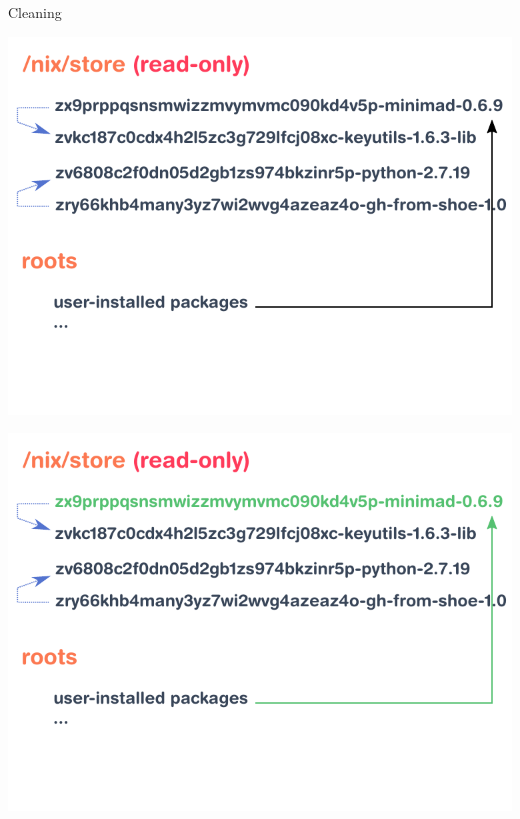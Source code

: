 \documentclass[aspectratio=169]{beamer}
\begin{document}
\begin{frame}{Cleaning}
{\begin{center}
            \includegraphics[height=0.98\textheight]{img/schema-nix-store-gc-v2-3.pdf}
        \end{center}
    }
     {
        \begin{center}
            \includegraphics[height=0.98\textheight]{img/schema-nix-store-gc-v2-4.pdf}
        \end{center}
     }
     {
        \begin{center}

\end{center}}
\end{frame}
\end{document}
